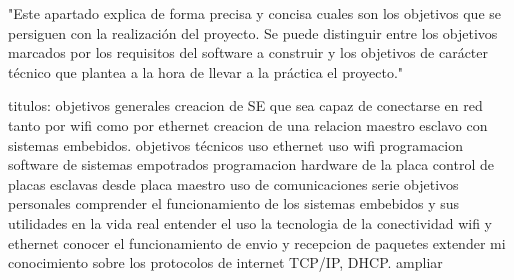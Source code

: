 
"Este apartado explica de forma precisa y concisa cuales son los objetivos que se persiguen con la realización del proyecto. Se puede distinguir entre los objetivos marcados por los requisitos del software a construir y los objetivos de carácter técnico que plantea a la hora de llevar a la práctica el proyecto."

titulos:
	objetivos generales
		creacion de SE que sea capaz de conectarse en red tanto por wifi como por ethernet
		creacion de una relacion maestro esclavo con sistemas embebidos.
	objetivos técnicos
		uso ethernet
		uso wifi
		programacion software de sistemas empotrados
		programacion hardware de la placa
		control de placas esclavas desde placa maestro
		uso de comunicaciones serie
	objetivos personales
		comprender el funcionamiento de los sistemas embebidos y sus utilidades en la vida real
		entender el uso la tecnologia de la conectividad wifi y ethernet
		conocer el funcionamiento de envio y recepcion de paquetes
		extender mi conocimiento sobre los protocolos de internet TCP/IP, DHCP.
		ampliar 
